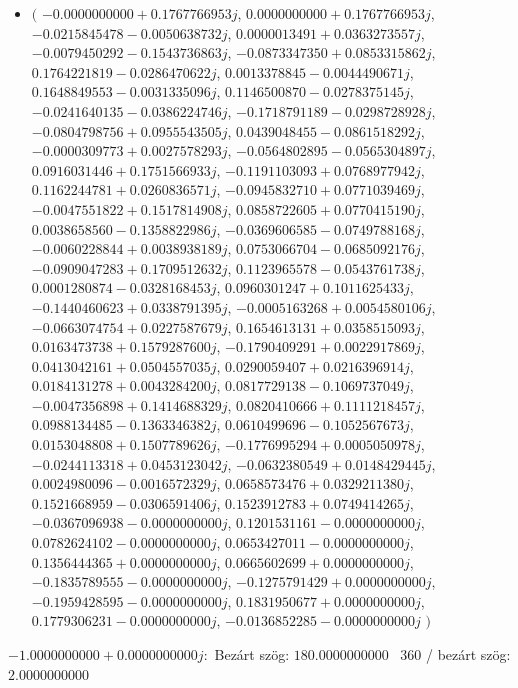 \documentclass[14pt,a4paper]{article}
\begin{document}
\begin{itemize}
\item
$\big($
$-0.0000000000+0.1767766953j$, $0.0000000000+0.1767766953j$, $-0.0215845478-0.0050638732j$, $0.0000013491+0.0363273557j$, $-0.0079450292-0.1543736863j$, $-0.0873347350+0.0853315862j$, $0.1764221819-0.0286470622j$, $0.0013378845-0.0044490671j$, $0.1648849553-0.0031335096j$, $0.1146500870-0.0278375145j$, $-0.0241640135-0.0386224746j$, $-0.1718791189-0.0298728928j$, $-0.0804798756+0.0955543505j$, $0.0439048455-0.0861518292j$, $-0.0000309773+0.0027578293j$, $-0.0564802895-0.0565304897j$, $0.0916031446+0.1751566933j$, $-0.1191103093+0.0768977942j$, $0.1162244781+0.0260836571j$, $-0.0945832710+0.0771039469j$, $-0.0047551822+0.1517814908j$, $0.0858722605+0.0770415190j$, $0.0038658560-0.1358822986j$, $-0.0369606585-0.0749788168j$, $-0.0060228844+0.0038938189j$, $0.0753066704-0.0685092176j$, $-0.0909047283+0.1709512632j$, $0.1123965578-0.0543761738j$, $0.0001280874-0.0328168453j$, $0.0960301247+0.1011625433j$, $-0.1440460623+0.0338791395j$, $-0.0005163268+0.0054580106j$, $-0.0663074754+0.0227587679j$, $0.1654613131+0.0358515093j$, $0.0163473738+0.1579287600j$, $-0.1790409291+0.0022917869j$, $0.0413042161+0.0504557035j$, $0.0290059407+0.0216396914j$, $0.0184131278+0.0043284200j$, $0.0817729138-0.1069737049j$, $-0.0047356898+0.1414688329j$, $0.0820410666+0.1111218457j$, $0.0988134485-0.1363346382j$, $0.0610499696-0.1052567673j$, $0.0153048808+0.1507789626j$, $-0.1776995294+0.0005050978j$, $-0.0244113318+0.0453123042j$, $-0.0632380549+0.0148429445j$, $0.0024980096-0.0016572329j$, $0.0658573476+0.0329211380j$, $0.1521668959-0.0306591406j$, $0.1523912783+0.0749414265j$, $-0.0367096938-0.0000000000j$, $0.1201531161-0.0000000000j$, $0.0782624102-0.0000000000j$, $0.0653427011-0.0000000000j$, $0.1356444365+0.0000000000j$, $0.0665602699+0.0000000000j$, $-0.1835789555-0.0000000000j$, $-0.1275791429+0.0000000000j$, $-0.1959428595-0.0000000000j$, $0.1831950677+0.0000000000j$, $0.1779306231-0.0000000000j$, $-0.0136852285-0.0000000000j$
$\big)$
\end{itemize}
$-1.0000000000+0.0000000000j$:\
Bezárt szög: $180.0000000000$ \
360 / bezárt szög: $2.0000000000$\
\end{document}
